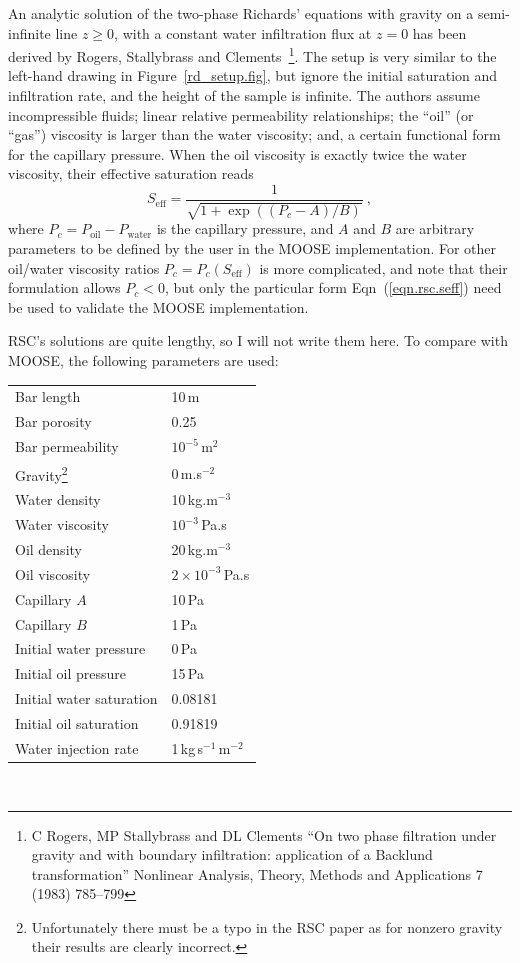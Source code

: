 \documentclass[]{scrreprt}
\begin{document}
An analytic solution of the two-phase Richards' equations with gravity
on a semi-infinite line $z\geq 0$, with a constant water infiltration
flux at $z=0$ has been derived by Rogers, Stallybrass and
Clements~\footnote{C Rogers, MP Stallybrass and DL Clements ``On two
  phase filtration under gravity and with boundary infiltration:
  application of a Backlund transformation'' Nonlinear Analysis,
  Theory, Methods and Applications 7 (1983) 785--799}.  The setup is
very similar to the left-hand drawing in Figure~\ref{rd_setup.fig},
but ignore the initial saturation and infiltration rate, and the
height of the sample is infinite.  The authors
assume incompressible fluids; linear relative permeability
relationships; the ``oil'' (or ``gas'') viscosity is larger than the
water viscosity; and, a certain functional form for the capillary
pressure.  When the oil viscosity is exactly twice the water
viscosity, their effective saturation reads
\begin{equation}
S_{\mathrm{eff}} = \frac{1}{\sqrt{1 + \exp((P_{c} - A)/B)}} \ ,
\label{eqn.rsc.seff}
\end{equation}
where $P_{c} = P_{\mathrm{oil}}-P_{\mathrm{water}}$ is the capillary
pressure, and $A$ and $B$ are arbitrary parameters to be defined by
the user in the MOOSE implementation.  For other oil/water viscosity
ratios $P_{c} = P_{c}(S_{\mathrm{eff}})$ is more complicated, and note
that their formulation allows $P_{c}<0$, but only
the particular form Eqn~(\ref{eqn.rsc.seff}) need be used to validate
the MOOSE implementation.

RSC's solutions are quite lengthy, so I will not write them here.  To
compare with MOOSE, the following parameters are used:
\begin{center}
\begin{tabular}{|ll|}
\hline
Bar length & 10\,m \\
Bar porosity & 0.25 \\
Bar permeability & $10^{-5}$\,m$^{2}$ \\
\hline
Gravity\footnote{Unfortunately there must be a typo in the RSC paper
  as for nonzero gravity their results are clearly incorrect.} & 0\,m.s$^{-2}$ \\
\hline
Water density & 10\,kg.m$^{-3}$ \\
Water viscosity & $10^{-3}$\,Pa.s \\
\hline
Oil density & 20\,kg.m$^{-3}$ \\
Oil viscosity & $2\times 10^{-3}$\,Pa.s \\
\hline
Capillary $A$ & 10\,Pa \\
Capillary $B$ & 1\,Pa \\
\hline
Initial water pressure & 0\,Pa \\
Initial oil pressure & 15\,Pa \\
Initial water saturation & 0.08181 \\
Initial oil saturation & 0.91819 \\
\hline
Water injection rate & 1\,kg\,s$^{-1}$\,m$^{-2}$ \\
\hline
\end{tabular} \\
\end{center}
\end{document}
